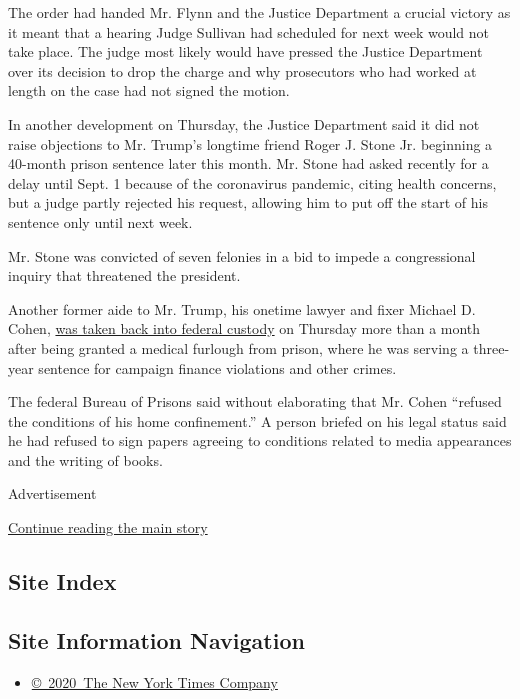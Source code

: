 The order had handed Mr. Flynn and the Justice Department a crucial
victory as it meant that a hearing Judge Sullivan had scheduled for next
week would not take place. The judge most likely would have pressed the
Justice Department over its decision to drop the charge and why
prosecutors who had worked at length on the case had not signed the
motion.

In another development on Thursday, the Justice Department said it did
not raise objections to Mr. Trump's longtime friend Roger J. Stone Jr.
beginning a 40-month prison sentence later this month. Mr. Stone had
asked recently for a delay until Sept. 1 because of the coronavirus
pandemic, citing health concerns, but a judge partly rejected his
request, allowing him to put off the start of his sentence only until
next week.

Mr. Stone was convicted of seven felonies in a bid to impede a
congressional inquiry that threatened the president.

Another former aide to Mr. Trump, his onetime lawyer and fixer Michael
D. Cohen,
\href{https://www.nytimes.com/2020/07/09/nyregion/michael-cohen-arrested.html}{was
taken back into federal custody} on Thursday more than a month after
being granted a medical furlough from prison, where he was serving a
three-year sentence for campaign finance violations and other crimes.

The federal Bureau of Prisons said without elaborating that Mr. Cohen
``refused the conditions of his home confinement.'' A person briefed on
his legal status said he had refused to sign papers agreeing to
conditions related to media appearances and the writing of books.

Advertisement

\protect\hyperlink{after-bottom}{Continue reading the main story}

\hypertarget{site-index}{%
\subsection{Site Index}\label{site-index}}

\hypertarget{site-information-navigation}{%
\subsection{Site Information
Navigation}\label{site-information-navigation}}

\begin{itemize}
\tightlist
\item
  \href{https://help.nytimes.com/hc/en-us/articles/115014792127-Copyright-notice}{©~2020~The
  New York Times Company}
\end{itemize}

